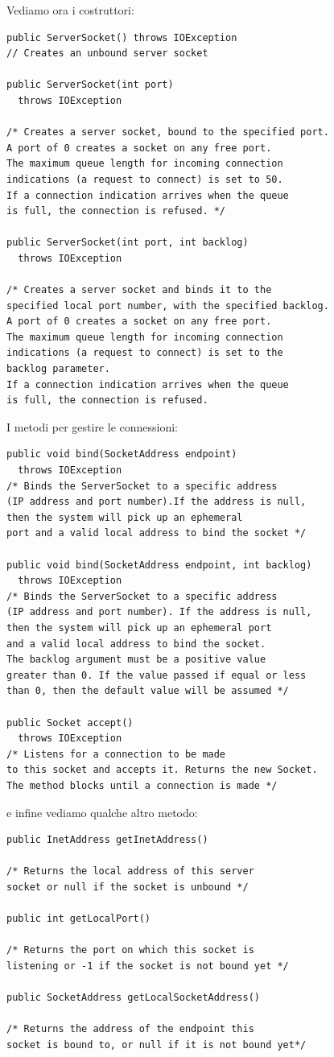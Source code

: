 \documentclass[a4paper,12pt, oneside]{book}
\begin{document}
Vediamo ora i costruttori:
\begin{verbatim}
public ServerSocket() throws IOException
// Creates an unbound server socket

public ServerSocket(int port) 
  throws IOException

/* Creates a server socket, bound to the specified port.
A port of 0 creates a socket on any free port.
The maximum queue length for incoming connection 
indications (a request to connect) is set to 50.
If a connection indication arrives when the queue
is full, the connection is refused. */
 
public ServerSocket(int port, int backlog) 
  throws IOException
  
/* Creates a server socket and binds it to the 
specified local port number, with the specified backlog.
A port of 0 creates a socket on any free port.
The maximum queue length for incoming connection
indications (a request to connect) is set to the
backlog parameter.
If a connection indication arrives when the queue
is full, the connection is refused.
\end{verbatim}
I metodi per gestire le connessioni:
\begin{verbatim}
public void bind(SocketAddress endpoint) 
  throws IOException
/* Binds the ServerSocket to a specific address 
(IP address and port number).If the address is null, 
then the system will pick up an ephemeral 
port and a valid local address to bind the socket */

public void bind(SocketAddress endpoint, int backlog) 
  throws IOException
/* Binds the ServerSocket to a specific address
(IP address and port number). If the address is null,
then the system will pick up an ephemeral port 
and a valid local address to bind the socket.
The backlog argument must be a positive value 
greater than 0. If the value passed if equal or less
than 0, then the default value will be assumed */

public Socket accept() 
  throws IOException
/* Listens for a connection to be made 
to this socket and accepts it. Returns the new Socket.
The method blocks until a connection is made */
\end{verbatim}
e infine vediamo qualche altro metodo:
\begin{verbatim}
public InetAddress getInetAddress()

/* Returns the local address of this server 
socket or null if the socket is unbound */

public int getLocalPort()

/* Returns the port on which this socket is 
listening or -1 if the socket is not bound yet */

public SocketAddress getLocalSocketAddress()

/* Returns the address of the endpoint this
socket is bound to, or null if it is not bound yet*/
\end{verbatim}
\end{document}
